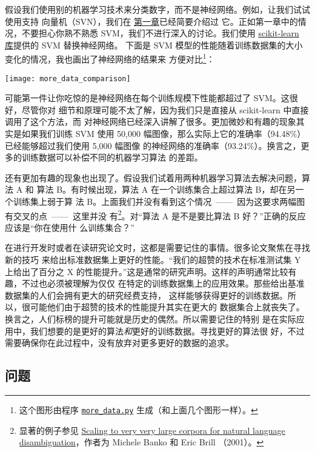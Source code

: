 假设我们使用别的机器学习技术来分类数字，而不是神经网络。例如，让我们试试使用支持
向量机（SVN），我们在%
\hyperref[ch:UsingNeuralNetsToRecognizeHandwrittenDigits]{第一章}已经简要介绍过
它。正如第一章中的情况，不要担心你熟不熟悉 SVM，我们不进行深入的讨论。我们使用
\href{http://scikit-learn.org/stable/}{scikit-learn 库}提供的 SVM 替换神经网络。
下面是 SVM 模型的性能随着训练数据集的大小变化的情况，我也画出了神经网络的结果来
方便对比\footnote{这个图形由程序
  \href{https://github.com/mnielsen/neural-networks-and-deep-learning/blob/master/fig/more_data.py}{\lstinline!more_data.py!}
  生成（和上面几个图形一样）。}：
\begin{center}
\texttt{[image: more\_data\_comparison]}
\end{center}

可能第一件让你吃惊的是神经网络在每个训练规模下性能都超过了 SVM。这很好，尽管你对
细节和原理可能不太了解，因为我们只是直接从 scikit-learn 中直接调用了这个方法，而
对神经网络已经深入讲解了很多。更加微妙和有趣的现象其实是如果我们训练 SVM 使用
50,000 幅图像，那么实际上它的准确率（94.48\%）已经能够超过我们使用 5,000 幅图像
的神经网络的准确率（93.24\%）。换言之，更多的训练数据可以补偿不同的机器学习算法
的差距。

还有更加有趣的现象也出现了。假设我们试着用两种机器学习算法去解决问题，算法 A 和
算法 B。有时候出现，算法 A 在一个训练集合上超过算法 B，却在另一个训练集上弱于算
法 B。上面我们并没有看到这个情况~——~因为这要求两幅图有交叉的点~——~这里并没
有\footnote{显著的例子参见
  \href{http://dx.doi.org/10.3115/1073012.1073017}{Scaling to very very large
    corpora for natural language disambiguation}，作者为 Michele Banko 和 Eric
  Brill （2001）。}。对“算法 A 是不是要比算法 B 好？”正确的反应应该是“你在使用什
么训练集合？”

在进行开发时或者在读研究论文时，这都是需要记住的事情。很多论文聚焦在寻找新的技巧
来给出标准数据集上更好的性能。“我们的超赞的技术在标准测试集 Y 上给出了百分之 X
的性能提升。”这是通常的研究声明。这样的声明通常比较有趣，不过也必须被理解为仅仅
在特定的训练数据集上的应用效果。那些给出基准数据集的人们会拥有更大的研究经费支持，
这样能够获得更好的训练数据。所以，很可能他们由于超赞的技术的性能提升其实在更大的
数据集合上就丧失了。换言之，人们标榜的提升可能就是历史的偶然。所以需要记住的特别
是在实际应用中，我们想要的是更好的算法\emph{和}更好的训练数据。寻找更好的算法很
好，不过需要确保你在此过程中，没有放弃对更多更好的数据的追求。

\subsection*{问题}

